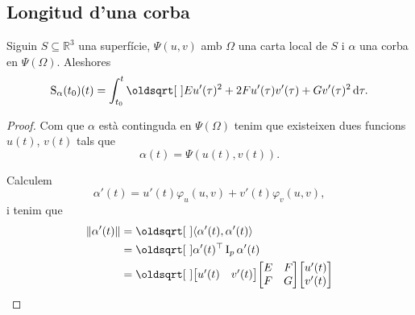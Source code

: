 \documentclass[../../Main.tex]{subfiles}
\begin{document}
	\subsection{Longitud d'una corba}
	\begin{proposition}
		\label{prop:longitud d'una corba en una superfície}
		Siguin \(S\subseteq\mathbb{R}^{3}\) una superfície, \(\Psi(u,v)\) amb \(\Omega\) una carta local de \(S\) i \(\alpha\) una corba en \(\Psi(\Omega)\). Aleshores
		\[
		    \funciolongituddarc_{\alpha}(t_{0})(t)=\int_{t_{0}}^{t}\sqrt{Eu'(\tau)^{2}+2Fu'(\tau)v'(\tau)+Gv'(\tau)^{2}}\diff \tau.
		\]
		\begin{proof}
			Com que \(\alpha\) està continguda en \(\Psi(\Omega)\) tenim que existeixen dues funcions \(u(t)\), \(v(t)\) tals que
			\[
			    \alpha(t)=\Psi(u(t),v(t)).
			\]
			
			Calculem
			\[
			    \alpha'(t)=u'(t)\varphi_{u}(u,v)+v'(t)\varphi_{v}(u,v),
			\]
			i tenim que
			\begin{align*}
				\norm{\alpha'(t)}&=\sqrt{\prodesc{\alpha'(t)}{\alpha'(t)}} \\
				&=\sqrt{\alpha'(t)^{\transposta}\I_{p}\alpha'(t)} \\
				&=\sqrt{\begin{bmatrix}
					u'(t) & v'(t)
				\end{bmatrix}
				\begin{bmatrix}
					E & F \\
					F & G
				\end{bmatrix}
				\begin{bmatrix}
					u'(t) \\
					v'(t)
				\end{bmatrix}}
			\end{align*}
		\end{proof}
	\end{proposition}
	

\begin{comment}
	Calcular curvatura de Gauss i curvatura mitjana d'un helicoide. (6.7)
	\[
	    \varphi(u,v)=(u\cos(v),u\sin(v),av).
	\]
	Línies de curvatura (7.3)
	Fer-ho tot per helicoides lol
\end{comment}

\end{document}
